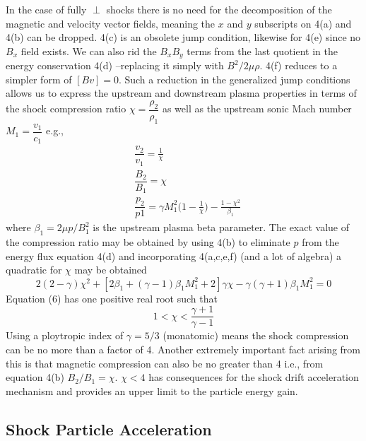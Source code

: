 In the case of fully $\perp$ shocks there is no need for the decomposition of the magnetic and velocity vector fields, meaning the $x$ and $y$ subscripts on 4(a) and 4(b) can be dropped. 4(c) is an obsolete jump condition, likewise for 4(e) since no $B_x$ field exists. We can also rid the $B_{x}B_{y}$ terms from the last quotient in the energy conservation 4(d) --replacing it simply with $B^{2}/2\mu\rho$. 4(f) reduces to a simpler form of $[Bv]=0$. Such a reduction in the generalized jump conditions allows us to express the upstream and downstream plasma properties in terms of the shock compression ratio $\chi=\dfrac{\rho_{2}}{\rho_{1}}$ as well as the upstream sonic Mach number $M_{1}=\dfrac{v_{1}}{c_{1}}$ \citep{priest2000} e.g.,
\begin{subequations}
\begin{align}
&\dfrac{v_{2}}{v_{1}}=\frac{1}{\chi} \\
&\dfrac{B_{2}}{B_{1}}=\chi \\
&\dfrac{p_{2}}{p{1}}=\gamma M_{1}^2\bigg(1-\frac{1}{\chi}\bigg) - \frac{1-\chi^2}{\beta_{1}}
\end{align}
\end{subequations}
where $\beta_{1}=2\mu p/B_{1}^2$ is the upstream plasma beta parameter. The exact value of the compression ratio may be obtained by using 4(b) to eliminate $p$ from the energy flux equation 4(d) and incorporating 4(a,c,e,f) (and a lot of algebra) a quadratic for $\chi$ may be obtained
\begin{equation}
2(2-\gamma)\chi^{2}+[2\beta_{1}+(\gamma-1)\beta_{1}M_{1}^2+2]\gamma\chi - \gamma(\gamma+1)\beta_{1}M_{1}^2=0
\end{equation}
Equation (6) has one positive real root such that 
\begin{equation}
1< \chi < \frac{\gamma+1}{\gamma-1}
\label{eqn:compression}
\end{equation}
Using a ploytropic index of $\gamma=5/3$ (monatomic) means the shock compression can be no more than a factor of 4. Another extremely important fact arising from this is that magnetic compression can also be no greater than 4 i.e., from equation 4(b) $B_{2}/B_{1}=\chi$. $\chi<4$ has consequences for the shock drift acceleration mechanism and provides an upper limit to the particle energy gain.

\subsection{Shock Particle Acceleration}\label{sec:30}

